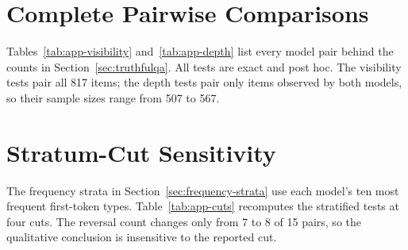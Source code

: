\documentclass[11pt]{article}
\begin{document}
\section{Complete Pairwise Comparisons}
\label{app:pairwise}
Tables~\ref{tab:app-visibility} and~\ref{tab:app-depth} list every model pair behind the counts in Section~\ref{sec:truthfulqa}. All tests are exact and post hoc. The visibility tests pair all 817 items; the depth tests pair only items observed by both models, so their sample sizes range from 507 to 567.

\begin{table}[t]
\centering
\resizebox{\textwidth}{!}{%

}
\caption{Paired exact McNemar tests on final top-10 visibility. ``A only'' counts items visible for model A and not model B. Holm gives 3/15 rejections at $.05$ and Benjamini--Hochberg gives 9/15.}
\label{tab:app-visibility}
\end{table}

\begin{table}[t]
\centering
\resizebox{\textwidth}{!}{%

}
\caption{Paired exact sign tests on first-entry depth, restricted to items observed by both models. $n$ is the pooled jointly observed count; the stratified counts are in the released table. $\Delta$ is the mean depth of model A minus model B, so a positive value means model A reads out later. Holm correction is applied within each of the three families. A dagger marks the seven pairs whose sign reverses between strata with both directions significant.}
\label{tab:app-depth}
\end{table}

\section{Stratum-Cut Sensitivity}
\label{app:cuts}
The frequency strata in Section~\ref{sec:frequency-strata} use each model's ten most frequent first-token types. Table~\ref{tab:app-cuts} recomputes the stratified tests at four cuts. The reversal count changes only from 7 to 8 of 15 pairs, so the qualitative conclusion is insensitive to the reported cut.

\begin{table}[!ht]
\centering
\resizebox{\columnwidth}{!}{%

}
\caption{Stratified tests recomputed at first-token frequency cuts of 5, 10, 20, and 30 types.}
\label{tab:app-cuts}
\end{table}
\end{document}
